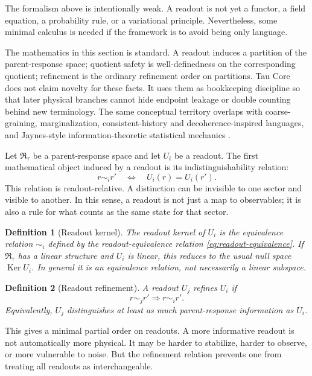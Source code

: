 \documentclass[11pt]{article}
\newtheorem{definition}{Definition}
\newcommand{\RTspace}{\mathfrak R_{\tau}}
\newcommand{\Ker}{\operatorname{Ker}}
\begin{document}
The formalism above is intentionally weak.  A readout is not yet a functor, a
field equation, a probability rule, or a variational principle.  Nevertheless,
some minimal calculus is needed if the framework is to avoid being only
language.

The mathematics in this section is standard.  A readout induces a partition of
the parent-response space; quotient safety is well-definedness on the
corresponding quotient; refinement is the ordinary refinement order on
partitions.  Tau Core does not claim novelty for these facts.  It uses them as
bookkeeping discipline so that later physical branches cannot hide endpoint
leakage or double counting behind new terminology.  The same conceptual
territory overlaps with coarse-graining, marginalization, consistent-history
and decoherence-inspired languages, and Jaynes-style information-theoretic
statistical mechanics \cite{Griffiths1984,GellMannHartle1990,Jaynes1957a,Jaynes1957b}.

Let \(\RTspace\) be a parent-response space and let \(U_i\) be a
readout.  The first mathematical object induced by a readout is its
indistinguishability relation:
\begin{equation}
  r \sim_i r'
  \quad \Longleftrightarrow \quad
  U_i(r)=U_i(r').
  \label{eq:readout-equivalence}
\end{equation}
This relation is readout-relative.  A distinction can be invisible to one
sector and visible to another.  In this sense, a readout is not just a map to
observables; it is also a rule for what counts as the same state for that
sector.

\begin{definition}[Readout kernel]
The readout kernel of \(U_i\) is the equivalence relation \(\sim_i\) defined
by the readout-equivalence relation \eqref{eq:readout-equivalence}.  If
\(\RTspace\) has a linear
structure and \(U_i\) is linear, this reduces to the usual null space
\(\Ker U_i\).  In general it is an equivalence relation, not necessarily a
linear subspace.
\end{definition}

\begin{definition}[Readout refinement]
A readout \(U_j\) refines \(U_i\) if
\[
  r\sim_j r' \Longrightarrow r\sim_i r'.
\]
Equivalently, \(U_j\) distinguishes at least as much parent-response
information as \(U_i\).
\end{definition}

This gives a minimal partial order on readouts.  A more informative readout is
not automatically more physical.  It may be harder to stabilize, harder to
observe, or more vulnerable to noise.  But the refinement relation prevents
one from treating all readouts as interchangeable.
\end{document}
